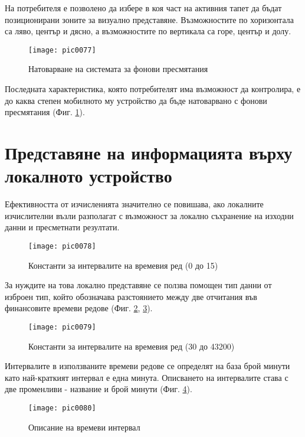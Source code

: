 На потребителя е позволено да избере в коя част на активния тапет да бъдат позиционирани зоните за визуално представяне. Възможностите по хоризонтала са ляво, център и дясно, а възможностите по вертикала са горе, център и долу. 

\begin{figure}[h]
  \centering
  \texttt{[image: pic0077]}
  \caption{Натоварване на системата за фонови пресмятания}
\label{fig:pic0077}
\end{figure}
\FloatBarrier

Последната характеристика, която потребителят има възможност да контролира, е до каква степен мобилното му устройство да бъде натоварвано с фонови пресмятания (Фиг. \ref{fig:pic0077}).

\section{Представяне на информацията върху локалното устройство}

Ефективността от изчисленията значително се повишава, ако локалните изчислителни възли разполагат с възможност за локално съхранение на изходни данни и пресметнати резултати. 

\begin{figure}[h]
  \centering
  \texttt{[image: pic0078]}
  \caption{Константи за интервалите на времевия ред (0 до 15)}
\label{fig:pic0078}
\end{figure}
\FloatBarrier

За нуждите на това локално представяне се ползва помощен тип данни от изброен тип, който обозначава разстоянието между две отчитания във финансовите времеви редове (Фиг. \ref{fig:pic0078}, \ref{fig:pic0079}).

\begin{figure}[h]
  \centering
  \texttt{[image: pic0079]}
  \caption{Константи за интервалите на времевия ред (30 до 43200)}
\label{fig:pic0079}
\end{figure}
\FloatBarrier

Интервалите в използваните времеви редове се определят на база брой минути като най-краткият интервал е една минута. Описването на интервалите става с две променливи - название и брой минути (Фиг. \ref{fig:pic0080}).

\begin{figure}[h]
  \centering
  \texttt{[image: pic0080]}
  \caption{Описание на времеви интервал}
\label{fig:pic0080}
\end{figure}
\FloatBarrier

